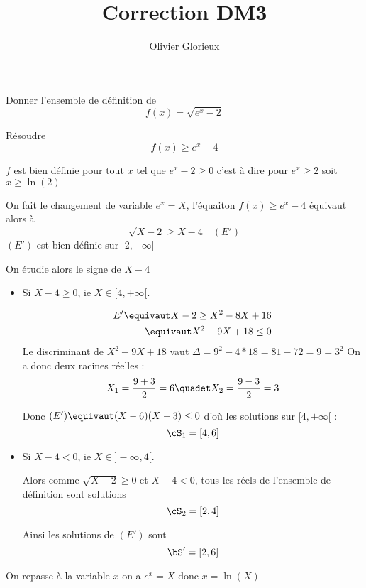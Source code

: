 \documentclass[a4paper, 11pt,reqno]{article}
\author{Olivier Glorieux}
\begin{document}
\title{Correction DM3 }
\begin{exercice}
Donner l'ensemble de définition de 
$$f(x) = \sqrt{e^x-2}$$

Résoudre $$f(x)\geq e^{x}-4$$
\end{exercice}

\begin{correction}
$f$ est bien définie pour tout $x$ tel que $e^x-2\geq 0$ c'est à dire pour $e^x\geq2$ soit $x\geq \ln(2)$

\conclusion{ $D_f =[\ln(2),+\infty[$}

On fait le changement de variable $e^x=X$, l'équaiton $f(x) \geq e^x-4$ équivaut alors à 
$$\sqrt{X-2} \geq X-4 \quad (E')$$
$(E')$ est bien définie sur $[2,+\infty[$

On étudie alors le signe de $X-4$

\begin{itemize}
\item Si $X-4\geq 0$, ie $X\in [4,+\infty[$. 

\begin{align*}
E' \equivaut X-2 \geq X^2 - 8X +16\\
	\equivaut X^2 -9X +18\leq 0
\end{align*}
Le discriminant de $X^2 -9X +18$ vaut $\Delta =9^2 - 4*18 = 81- 72 =9=3^2$
On a donc deux racines réelles : 
$$X_1= \frac{9 +3}{2} = 6 \quadet X_2 = \frac{9-3}{2}= 3$$

Donc $(E') \equivaut  (X-6)(X-3)\leq 0$ d'où les solutions sur $ [4,+\infty[$ : 
$$\cS_1= [4,6]$$


\item Si $X-4<0$, ie $X\in ]-\infty,4[$. 

Alors comme $\sqrt{X-2} \geq 0$  et $X-4<0$, tous les réels de l'ensemble de définition sont solutions 
$$\cS_2 = [2,4]$$


Ainsi les solutions de $(E')$ sont 
$$\bS' = [2,6]$$



\end{itemize}

On repasse à la variable $x$ on a $e^x =X$ donc $x =\ln(X)$


\end{correction}
\end{document}
